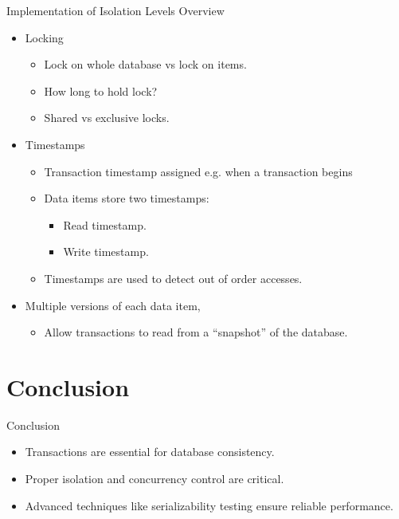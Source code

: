 \documentclass{beamer}
\begin{document}
\begin{frame}{Implementation of Isolation Levels}
    Overview
    \begin{itemize}
        \item Locking
            \begin{itemize}
                \item Lock on whole database vs lock on items.
                \item How long to hold lock?
                \item Shared vs exclusive locks.
            \end{itemize}
        \item Timestamps
            \begin{itemize}
                \item Transaction timestamp assigned e.g. when a transaction begins
                \item Data items store two timestamps:
                    \begin{itemize}
                        \item Read timestamp.
                        \item Write timestamp.
                    \end{itemize}
                \item Timestamps are used to detect out of order accesses.
            \end{itemize}
        \item Multiple versions of each data item,
            \begin{itemize}
             \item Allow transactions to read from a ``snapshot'' of the database.
            \end{itemize}
    \end{itemize}
\end{frame}



\section{Conclusion}

\begin{frame}{Conclusion}
    \begin{itemize}
        \item Transactions are essential for database consistency.
        \item Proper isolation and concurrency control are critical.
        \item Advanced techniques like serializability testing ensure reliable performance.
    \end{itemize}
\end{frame}
\end{document}
